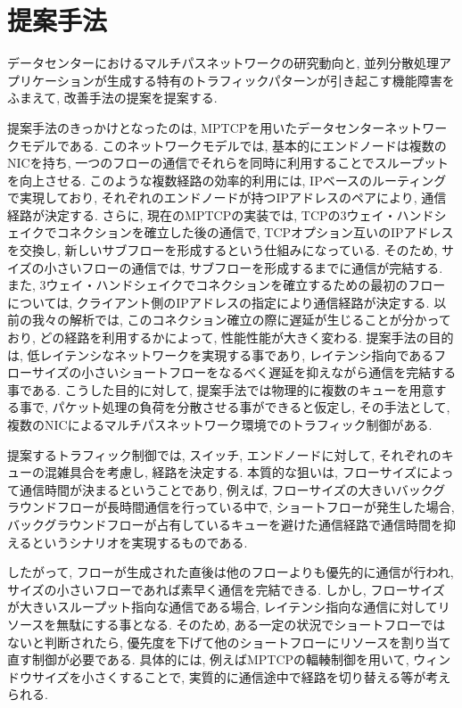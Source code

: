 \documentclass[11pt, a4paper, twocolumn]{jsarticle}
\begin{document}
\section{提案手法}
\label{sec:proposed_method}
データセンターにおけるマルチパスネットワークの研究動向と, 並列分散処理アプリケーションが生成する特有のトラフィックパターンが引き起こす機能障害をふまえて,
改善手法の提案を提案する.

提案手法のきっかけとなったのは, MPTCPを用いたデータセンターネットワークモデルである\cite{improving}.
このネットワークモデルでは, 基本的にエンドノードは複数のNICを持ち, 一つのフローの通信でそれらを同時に利用することでスループットを向上させる.
このような複数経路の効率的利用には, IPベースのルーティングで実現しており, それぞれのエンドノードが持つIPアドレスのペアにより, 通信経路が決定する.
さらに, 現在のMPTCPの実装では, TCPの3ウェイ・ハンドシェイクでコネクションを確立した後の通信で, TCPオプション互いのIPアドレスを交換し,
新しいサブフローを形成するという仕組みになっている.
そのため, サイズの小さいフローの通信では, サブフローを形成するまでに通信が完結する.
また, 3ウェイ・ハンドシェイクでコネクションを確立するための最初のフローについては, クライアント側のIPアドレスの指定により通信経路が決定する.
以前の我々の解析では, このコネクション確立の際に遅延が生じることが分かっており\cite{mptcp_ana}, どの経路を利用するかによって,
性能性能が大きく変わる.
提案手法の目的は, 低レイテンシなネットワークを実現する事であり,
レイテンシ指向であるフローサイズの小さいショートフローをなるべく遅延を抑えながら通信を完結する事である.
こうした目的に対して, 提案手法では物理的に複数のキューを用意する事で, パケット処理の負荷を分散させる事ができると仮定し, その手法として,
複数のNICによるマルチパスネットワーク環境でのトラフィック制御がある.

提案するトラフィック制御では, スイッチ, エンドノードに対して, それぞれのキューの混雑具合を考慮し, 経路を決定する.
本質的な狙いは, フローサイズによって通信時間が決まるということであり, 例えば, フローサイズの大きいバックグラウンドフローが長時間通信を行っている中で,
ショートフローが発生した場合, バックグラウンドフローが占有しているキューを避けた通信経路で通信時間を抑えるというシナリオを実現するものである.

したがって, フローが生成された直後は他のフローよりも優先的に通信が行われ, サイズの小さいフローであれば素早く通信を完結できる.
しかし, フローサイズが大きいスループット指向な通信である場合, レイテンシ指向な通信に対してリソースを無駄にする事となる.
そのため, ある一定の状況でショートフローではないと判断されたら, 優先度を下げて他のショートフローにリソースを割り当て直す制御が必要である.
具体的には, 例えばMPTCPの輻輳制御を用いて, ウィンドウサイズを小さくすることで, 実質的に通信途中で経路を切り替える等が考えられる.
\end{document}
